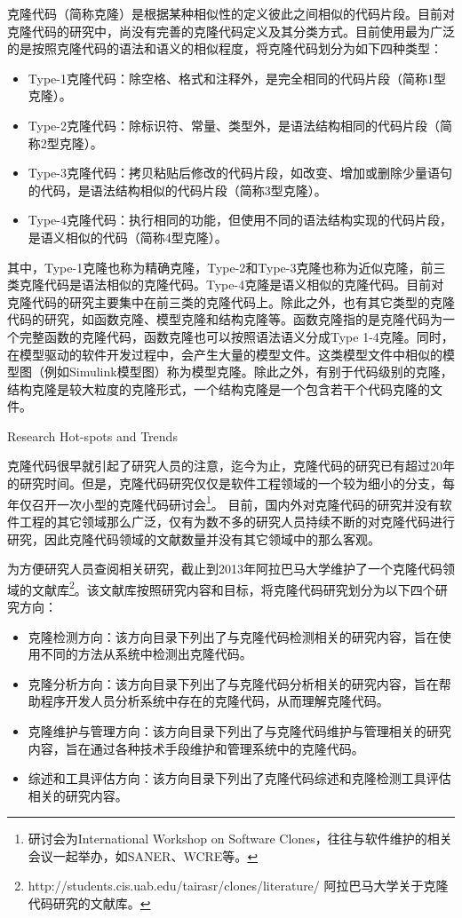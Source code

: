 克隆代码（简称克隆）是根据某种相似性的定义彼此之间相似的代码片段\cite{roy2007survey}。目前对克隆代码的研究中，尚没有完善的克隆代码定义及其分类方式。目前使用最为广泛的是按照克隆代码的语法和语义的相似程度，将克隆代码划分为如下四种类型\cite{koschke2007survey}：
\begin{itemize}
\item 
Type-1克隆代码：除空格、格式和注释外，是完全相同的代码片段（简称1型克隆）。
\item 
Type-2克隆代码：除标识符、常量、类型外，是语法结构相同的代码片段（简称2型克隆）。
\item 
Type-3克隆代码：拷贝粘贴后修改的代码片段，如改变、增加或删除少量语句的代码，是语法结构相似的代码片段（简称3型克隆）。
\item 
Type-4克隆代码：执行相同的功能，但使用不同的语法结构实现的代码片段，是语义相似的代码（简称4型克隆）。
\end{itemize}

其中，Type-1克隆也称为精确克隆，Type-2和Type-3克隆也称为近似克隆，前三类克隆代码是语法相似的克隆代码。Type-4克隆是语义相似的克隆代码。目前对克隆代码的研究主要集中在前三类的克隆代码上。除此之外，也有其它类型的克隆代码的研究，如函数克隆\cite{roy2008empirical}、模型克隆\cite{alalfi2012models}和结构克隆\cite{basit2009data}\cite{basit2005detecting}等。函数克隆指的是克隆代码为一个完整函数的克隆代码，函数克隆也可以按照语法语义分成Type 1-4克隆。同时，在模型驱动的软件开发过程中，会产生大量的模型文件。这类模型文件中相似的模型图（例如Simulink模型图）称为模型克隆。除此之外，有别于代码级别的克隆，结构克隆是较大粒度的克隆形式，一个结构克隆是一个包含若干个代码克隆的文件。

{Research Hot-spots and Trends}

克隆代码很早就引起了研究人员的注意，迄今为止，克隆代码的研究已有超过20年的研究时间。但是，克隆代码研究仅仅是软件工程领域的一个较为细小的分支，每年仅召开一次小型的克隆代码研讨会\footnote{研讨会为International Workshop on Software Clones，往往与软件维护的相关会议一起举办，如SANER、WCRE等。}。
目前，国内外对克隆代码的研究并没有软件工程的其它领域那么广泛，仅有为数不多的研究人员持续不断的对克隆代码进行研究，因此克隆代码领域的文献数量并没有其它领域中的那么客观。

为方便研究人员查阅相关研究，截止到2013年阿拉巴马大学维护了一个克隆代码领域的文献库\footnote{ http://students.cis.uab.edu/tairasr/clones/literature/ 阿拉巴马大学关于克隆代码研究的文献库。}。该文献库按照研究内容和目标，将克隆代码研究划分为以下四个研究方向：

\begin{itemize}
\item 
克隆检测方向：该方向目录下列出了与克隆代码检测相关的研究内容，旨在使用不同的方法从系统中检测出克隆代码。
\item 
克隆分析方向：该方向目录下列出了与克隆代码分析相关的研究内容，旨在帮助程序开发人员分析系统中存在的克隆代码，从而理解克隆代码。
\item 
克隆维护与管理方向：该方向目录下列出了与克隆代码维护与管理相关的研究内容，旨在通过各种技术手段维护和管理系统中的克隆代码。
\item 
综述和工具评估方向：该方向目录下列出了克隆代码综述和克隆检测工具评估相关的研究内容。
\end{itemize}

